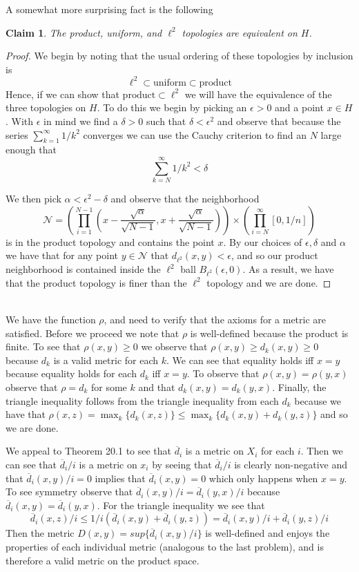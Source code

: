 \documentclass{article}
\newcommand{\problem}[1]{\noindent{\textbf{Problem #1}}\\}
\newcommand{\problempart}[1]{\noindent{\textbf{(#1)}}}
\newtheorem*{claim}{Claim}
\begin{document}
A somewhat more surprising fact is the following\\
\begin{claim}
The product, uniform, and $\ell^2$ topologies are equivalent on $H$. 
\end{claim}
\begin{proof}
We begin by noting that the usual ordering of these topologies by inclusion is
\[
 \ell^2 \subset \text{uniform} \subset \text{product}
\]
Hence, if we can show that $\text{product} \subset \ell^2$ we will have the equivalence of the three topologies on $H$. To do this we begin by picking an $\epsilon > 0$ and a point $x \in H$. With $\epsilon$ in mind we find a $\delta > 0$ such that $\delta < \epsilon^2$ and observe that because the series $\sum_{k=1}^\infty 1/k^2$ converges we can use the Cauchy criterion to find an $N$ large enough that 
\[
\sum_{k=N}^\infty 1/k^2 < \delta
\]

We then pick $\alpha < \epsilon^2 - \delta$ and observe that the neighborhood 
\[
\mathcal{N} = \left(\prod_{i=1}^{N-1} (x - \frac{\sqrt{\alpha}}{\sqrt{N - 1}}, x + \frac{\sqrt{\alpha}}{\sqrt{N - 1}})\right) \times \left(\prod_{i = N}^\infty [0, 1/n]\right)
\]
is in the product topology and contains the point $x$. By our choices of $\epsilon, \delta$ and $\alpha$ we have that for any point $y\in \mathcal{N}$ that $d_{\ell^2}(x,y) < \epsilon$, and so our product neighborhood is contained inside the $\ell^2$ ball $B_{\ell^2}(\epsilon, 0)$. As a result, we have that the product topology is finer than the $\ell^2$ topology and we are done. 
\end{proof}
\problem{2.21.3}
\problempart{a} We have the function $\rho$, and need to verify that the axioms for a metric are satisfied. Before we proceed we note that $\rho$ is well-defined because the product is finite. To see that $\rho(x,y) \geq 0$ we observe that $\rho(x,y) \geq d_k(x,y) \geq 0$ because $d_k$ is a valid metric for each $k$. We can see that equality holds iff $x = y$ because equality holds for each $d_k$ iff $x = y$. To observe that $\rho(x,y) = \rho(y,x)$ observe that $\rho = d_k$ for some $k$ and that $d_k(x,y) = d_k(y,x)$. Finally, the triangle inequality follows from the triangle inequality from each $d_k$ because we have that $\rho(x,z) = \max_k\{d_k(x,z)\} \leq \max_k\{d_k(x,y) + d_k(y,z)\}$ and so we are done. 

\problempart{b} We appeal to Theorem 20.1 to see that $\overline{d}_i$ is a metric on $X_i$ for each $i$. Then we can see that $\overline{d}_i/i$ is a metric on $x_i$ by seeing that $\overline{d}_i/i$ is clearly non-negative and that $\overline{d}_i(x,y)/i = 0$ implies that $\overline{d}_i(x,y) = 0$ which only happens when $x=y$. To see symmetry observe that $\overline{d}_i(x,y)/i = \overline{d}_i(y,x)/i$ because $\overline{d}_i(x,y) = \overline{d}_i(y,x)$. For the triangle inequality we see that 
\[
\overline{d}_i(x,z)/i \leq 1/i(\overline{d}_i(x,y) + \overline{d}_i(y,z)) = \overline{d}_i(x,y)/i + \overline{d}_i(y,z)/i
\]
Then the metric $D(x,y) = sup\{\overline{d}_i(x,y)/i\}$ is well-defined and enjoys the properties of each individual metric (analogous to the last problem), and is therefore a valid metric on the product space. 
\end{document}

